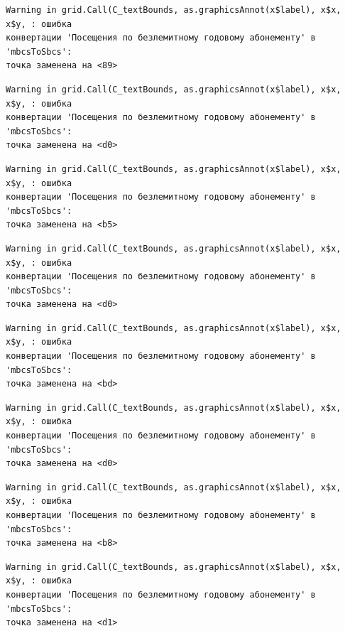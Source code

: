\documentclass[
  letterpaper,
  DIV=11,
  numbers=noendperiod]{scrreprt}
\begin{document}
\begin{verbatim}
Warning in grid.Call(C_textBounds, as.graphicsAnnot(x$label), x$x, x$y, : ошибка
конвертации 'Посещения по безлемитному годовому абонементу' в 'mbcsToSbcs':
точка заменена на <89>
\end{verbatim}

\begin{verbatim}
Warning in grid.Call(C_textBounds, as.graphicsAnnot(x$label), x$x, x$y, : ошибка
конвертации 'Посещения по безлемитному годовому абонементу' в 'mbcsToSbcs':
точка заменена на <d0>
\end{verbatim}

\begin{verbatim}
Warning in grid.Call(C_textBounds, as.graphicsAnnot(x$label), x$x, x$y, : ошибка
конвертации 'Посещения по безлемитному годовому абонементу' в 'mbcsToSbcs':
точка заменена на <b5>
\end{verbatim}

\begin{verbatim}
Warning in grid.Call(C_textBounds, as.graphicsAnnot(x$label), x$x, x$y, : ошибка
конвертации 'Посещения по безлемитному годовому абонементу' в 'mbcsToSbcs':
точка заменена на <d0>
\end{verbatim}

\begin{verbatim}
Warning in grid.Call(C_textBounds, as.graphicsAnnot(x$label), x$x, x$y, : ошибка
конвертации 'Посещения по безлемитному годовому абонементу' в 'mbcsToSbcs':
точка заменена на <bd>
\end{verbatim}

\begin{verbatim}
Warning in grid.Call(C_textBounds, as.graphicsAnnot(x$label), x$x, x$y, : ошибка
конвертации 'Посещения по безлемитному годовому абонементу' в 'mbcsToSbcs':
точка заменена на <d0>
\end{verbatim}

\begin{verbatim}
Warning in grid.Call(C_textBounds, as.graphicsAnnot(x$label), x$x, x$y, : ошибка
конвертации 'Посещения по безлемитному годовому абонементу' в 'mbcsToSbcs':
точка заменена на <b8>
\end{verbatim}

\begin{verbatim}
Warning in grid.Call(C_textBounds, as.graphicsAnnot(x$label), x$x, x$y, : ошибка
конвертации 'Посещения по безлемитному годовому абонементу' в 'mbcsToSbcs':
точка заменена на <d1>
\end{verbatim}
\end{document}
